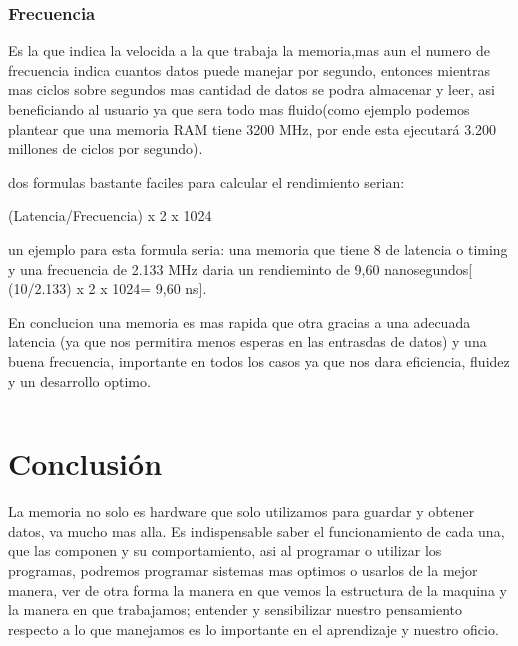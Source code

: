 \documentclass{article}
\begin{document}
    \subsubsection{Frecuencia} Es la que indica la velocida a la que trabaja la memoria,mas aun el numero de frecuencia indica cuantos datos puede manejar por segundo, entonces mientras mas ciclos sobre segundos mas cantidad de datos se podra almacenar y leer, asi beneficiando al usuario ya que sera todo mas fluido(como ejemplo podemos plantear que una memoria RAM tiene 3200 MHz, por ende esta ejecutará 3.200 millones de ciclos por segundo).\cite{computerhoy}
    
    dos formulas bastante faciles para calcular el rendimiento  serian: 
    
    (Latencia/Frecuencia) x 2 x 1024
    
    un ejemplo para esta formula seria: una memoria que tiene 8 de latencia o timing y una frecuencia de 2.133 MHz daria un rendieminto de 9,60 nanosegundos[ (10/2.133) x 2 x 1024= 9,60 ns].
    
    En conclucion una memoria es mas rapida que otra gracias a una adecuada latencia (ya que nos permitira menos esperas en las entrasdas de datos) y una buena frecuencia, importante en todos los casos ya que nos dara eficiencia, fluidez y un desarrollo optimo.

\begin{lstlisting}

\end{lstlisting}

\section{Conclusión} \label{conclulsion}
La memoria no solo es hardware que solo utilizamos para guardar y obtener datos, va mucho mas alla. Es indispensable saber el funcionamiento de cada una, que las componen y su comportamiento, asi al programar o utilizar los programas, podremos programar sistemas mas optimos o usarlos de la mejor manera, ver de otra forma la manera en que vemos la estructura de la maquina y la manera en que trabajamos; entender y sensibilizar nuestro pensamiento respecto a lo que manejamos es lo importante en el aprendizaje y nuestro oficio.



\end{document}
